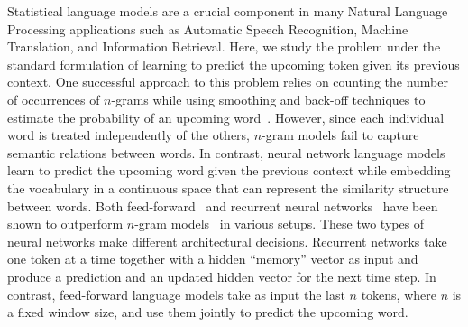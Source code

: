 Statistical language models are a crucial component in many Natural
Language Processing applications such as Automatic Speech Recognition,
Machine Translation, and Information Retrieval. Here, we study the
problem under the standard formulation of learning to predict the
upcoming token given its previous context.
One successful approach to this problem relies on counting the number
of occurrences of $n$-grams while using smoothing and back-off
techniques to estimate the probability of an upcoming
word~\cite{kneser1995improved}. However, since each individual word is
treated independently of the others, $n$-gram models fail to capture
semantic relations between words. In contrast, neural network language
models~\cite{bengio2006neural} learn to predict the upcoming word
given the previous context while embedding the vocabulary in a
continuous space that can represent the similarity structure between
words. Both feed-forward~\cite{schwenk2007continuous} and recurrent
neural networks~\cite{mikolov2010recurrent} have been shown to
outperform $n$-gram
models~\cite{mikolov2010recurrent,le2011structured} in various setups.
These two types of neural networks make different architectural
decisions. Recurrent networks take one token at a time together with a
hidden ``memory'' vector as input and produce a prediction and an
updated hidden vector for the next time step. In contrast,
feed-forward language models take as input the last $n$ tokens, where
$n$ is a fixed window size, and use them jointly to predict the
upcoming word. %


